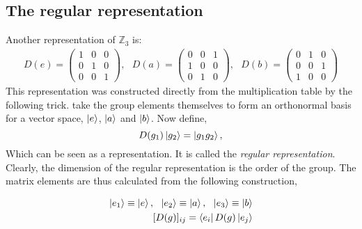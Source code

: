 \subsection{The regular representation}
Another representation of $\mathbb{Z}_3$ is: 
\begin{eqnarray}\label{eqn:Z3 basis rep}
    D(e) = \begin{pmatrix}
        1 & 0 & 0\\
        0 & 1 & 0\\
        0 & 0 & 1
    \end{pmatrix}, \ \ \ 
    D(a) = \begin{pmatrix}
        0 & 0 & 1\\
        1 & 0 & 0\\
        0 & 1 & 0
    \end{pmatrix}, \ \ \
    D(b) = \begin{pmatrix}
        0 & 1 & 0\\
        0 & 0 & 1\\
        1 & 0 & 0
    \end{pmatrix}
\end{eqnarray}
This representation was constructed directly from the multiplication table by the following trick. take the group elements themselves to form an orthonormal basis for a vector space, $\ket{e}$, $\ket{a}$ and $\ket{b}$. Now define, 
\begin{equation}\label{eqn:regrepbasis}
    D(g_1)\ket{g_2}=  \ket{g_1g_2},
\end{equation}
Which can be seen as a representation. It is called the \textit{regular representation}. Clearly, the dimension of the regular representation is the order of the group. The matrix elements are thus calculated from the following construction, 

\begin{equation}
\begin{split}
    \ket{e_1}\equiv \ket{e}, \ \ \ket{e_2}\equiv \ket{a}, \ \ \ket{e_3}\equiv \ket{b}\\
    [ D(g) ]_{ij} = \bra{e_i}D(g)\ket{e_j}
\end{split}
\end{equation}

